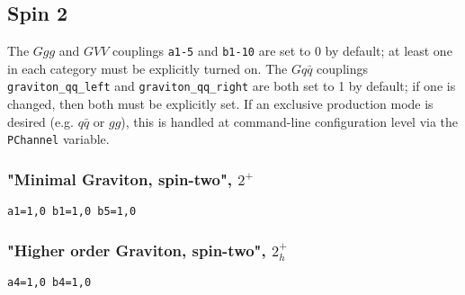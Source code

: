 \documentclass[aps,superscriptaddress,nofootinbib]{revtex4}
\begin{document}
\subsection{Spin 2}
The $Ggg$ and $GVV$ couplings \verb|a1-5| and \verb|b1-10| are set to 0 by default; at least one in each category must be explicitly turned on.  The $Gq\bar{q}$ couplings \verb|graviton_qq_left| and \verb|graviton_qq_right| are both set to 1 by default; if one is changed, then both must be explicitly set.
If an exclusive production mode is desired (e.g. $q\bar{q}$ or $gg$), this is handled at command-line configuration level via the \verb|PChannel| variable.
\subsubsection{"Minimal Graviton, spin-two", \texorpdfstring{$2^+$}{2+}}
\verb|a1=1,0 b1=1,0 b5=1,0|
\subsubsection{"Higher order Graviton, spin-two", \texorpdfstring{$2^+_h$}{2+h}}
\verb|a4=1,0 b4=1,0|
\end{document}
